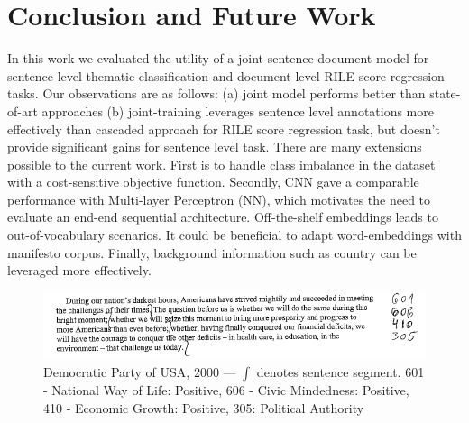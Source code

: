 \documentclass[11pt,a4paper]{article}
\begin{document}
\section{Conclusion and Future Work}
In this work we evaluated the utility of a joint sentence-document model for sentence level thematic classification and document level RILE score regression tasks. Our observations are as follows: (a) joint model performs better than state-of-art approaches (b) joint-training leverages sentence level annotations more effectively than cascaded approach for RILE score regression task, but doesn't provide significant gains for sentence level task. There are many extensions possible to the current work. First is to handle class imbalance in the dataset with a cost-sensitive objective function. Secondly, CNN gave a comparable performance with Multi-layer Perceptron (NN), which motivates the need to evaluate an end-end sequential architecture. Off-the-shelf embeddings leads to out-of-vocabulary scenarios. It could be beneficial to  adapt word-embeddings with manifesto corpus. Finally, background information such as country can be leveraged more effectively.


\begin{figure}
\includegraphics[width=1\linewidth]{US_Democrats_1.png}
\caption{Democratic Party of USA, 2000 --- $\int$ denotes sentence segment. 601 - National Way of Life: Positive, 606 - Civic Mindedness: Positive, 410 - Economic Growth: Positive, 305: Political Authority}
\label{fig:sub2}
\end{figure}

\end{document}
